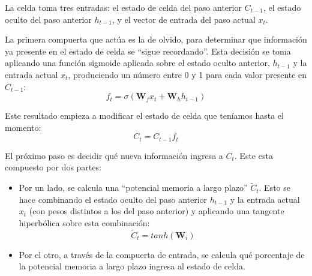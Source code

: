 \documentclass[../../main.tex]{subfiles}
\begin{document}
La celda toma tres entradas: el estado de celda del paso anterior \(C_{t-1}\),
el estado oculto del paso anterior \(h_{t-1}\), y el vector de entrada del paso actual
\(x_t\).

La primera compuerta que actúa es la de olvido, para determinar que información ya
presente en el estado de celda se ``sigue recordando''. Esta decisión se toma aplicando
una función sigmoide aplicada sobre el estado oculto anterior, \(h_{t-1}\) y la entrada
actual \(x_t\), produciendo un número entre 0 y 1 para cada valor presente en \(C_{t-1}\):
\[
    f_t = \sigma \left( \bm{W}_f x_t + \bm{W}_h h_{t-1}  \right)
\]

Este resultado empieza a modificar el estado de celda que teníamos hasta el momento:
\[
    C_t = C_{t-1} f_t
\]

El próximo paso es decidir qué nueva información ingresa a \(C_t\). Este esta compuesto
por dos partes:
\begin{itemize}
    \item Por un lado, se calcula una ``potencial memoria a largo plazo'' \(\tilde{C}_t\).
    Esto se hace combinando el estado oculto del paso anterior \(h_{t-1}\) y la entrada
    actual \(x_t\) (con pesos distintos a los del paso anterior) y aplicando una tangente
    hiperbólica sobre esta combinación:
    \[
    \tilde{C}_t = tanh \left( \bm{W}_i\right)
    \]
    \item Por el otro, a través de la compuerta de entrada, se calcula qué porcentaje de
    la potencial memoria a largo plazo ingresa al estado de celda.
\end{itemize}
\end{document}
